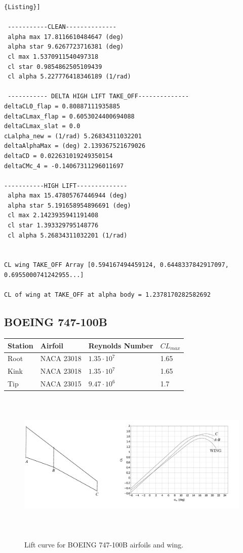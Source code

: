 \begin{lstlisting}[caption={{\footnotesize Wing Lift characteristic results for TAKE-OFF. ATR-72, M=0.2 }},label= [style=\bfseries]{Listing}]

 -----------CLEAN-------------- 
 alpha max 17.8116610484647 (deg)
 alpha star 9.6267723716381 (deg)
 cl max 1.5370911540497318
 cl star 0.9854862505109439
 cl alpha 5.227776418346189 (1/rad)

 ----------- DELTA HIGH LIFT TAKE_OFF-------------- 
deltaCL0_flap = 0.80887111935885
deltaCLmax_flap = 0.6053024400694088
deltaCLmax_slat = 0.0
cLalpha_new = (1/rad) 5.26834311032201
deltaAlphaMax = (deg) 2.139367521679026
deltaCD = 0.022631019249350154
deltaCMc_4 = -0.14067311296011697

-----------HIGH LIFT-------------- 
 alpha max 15.47805767446944 (deg)
 alpha star 5.191658954896691 (deg)
 cl max 2.1423935941191408
 cl star 1.393329795148776
 cl alpha 5.26834311032201 (1/rad)


CL wing TAKE_OFF Array [0.594167494459124, 0.6448337842917097, 0.6955000741242955...]

CL of wing at TAKE_OFF at alpha body = 1.2378170282582692

\end{lstlisting}


\subsection{BOEING 747-100B}


\begin{center}
	\begin{tabular}{ | l | l | l | l |}
		\hline
		Station & Airfoil & Reynolds Number & $CL_{max}$ \\ \hline
		Root & NACA 23018 & $1.35 \cdot 10^7$ & 1.65 \\ \hline
		Kink & NACA 23018 &  $1.35 \cdot 10^7$ & 1.65 \\ \hline
		Tip & NACA 23015 & $9.47 \cdot 10^6$ & 1.7 \\
		\hline
	\end{tabular}
\end{center}


\begin{figure}[H]
	\centering
	{\includegraphics[height=6.9cm]{Immagini/BOEING_Topview.pdf}} 
	\caption{Lift curve for BOEING 747-100B airfoils and wing.}
	\label{fig:clalf}
\end{figure}

